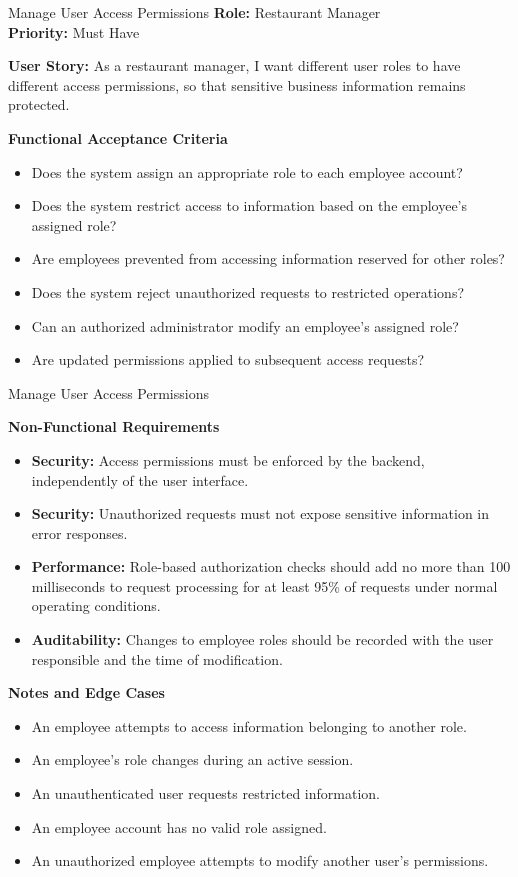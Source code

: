 
\begin{frame}{Manage User Access Permissions}
\noindent\textbf{Role:} Restaurant Manager\\
\textbf{Priority:} Must Have

\textbf{User Story:} As a restaurant manager, I want different user roles to have different access permissions, so that sensitive business information remains protected.

\textbf{Functional Acceptance Criteria}
\begin{itemize}
  \item Does the system assign an appropriate role to each employee account?
  \item Does the system restrict access to information based on the employee's assigned role?
  \item Are employees prevented from accessing information reserved for other roles?
  \item Does the system reject unauthorized requests to restricted operations?
  \item Can an authorized administrator modify an employee's assigned role?
  \item Are updated permissions applied to subsequent access requests?
\end{itemize}

\end{frame}

\begin{frame}{Manage User Access Permissions}

\textbf{Non-Functional Requirements}
\begin{itemize}
  \item \textbf{Security:} Access permissions must be enforced by the backend, independently of the user interface.
  \item \textbf{Security:} Unauthorized requests must not expose sensitive information in error responses.
  \item \textbf{Performance:} Role-based authorization checks should add no more than 100 milliseconds to request processing for at least 95\% of requests under normal operating conditions.
  \item \textbf{Auditability:} Changes to employee roles should be recorded with the user responsible and the time of modification.
\end{itemize}

\textbf{Notes and Edge Cases}
\begin{itemize}
  \item An employee attempts to access information belonging to another role.
  \item An employee's role changes during an active session.
  \item An unauthenticated user requests restricted information.
  \item An employee account has no valid role assigned.
  \item An unauthorized employee attempts to modify another user's permissions.
\end{itemize}

\end{frame}
